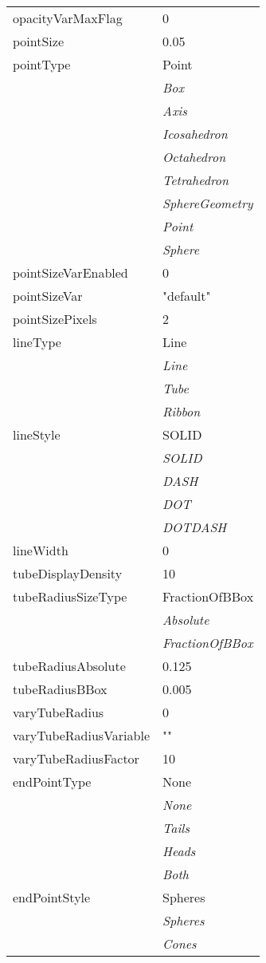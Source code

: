 \documentclass[10pt,a4paper]{report}
\begin{document}
\begin{longtable}{ll}
opacityVarMaxFlag  &  0 \\
pointSize  &  0.05 \\
pointType  &  Point   \\
 & {\it  Box} \\
 & {\it  Axis} \\
 & {\it  Icosahedron} \\
 & {\it  Octahedron} \\
 & {\it  Tetrahedron} \\
 & {\it  SphereGeometry} \\
 & {\it  Point} \\
 & {\it  Sphere} \\
pointSizeVarEnabled  &  0 \\
pointSizeVar  &  "default" \\
pointSizePixels  &  2 \\
lineType  &  Line   \\
 & {\it  Line} \\
 & {\it  Tube} \\
 & {\it  Ribbon} \\
lineStyle  &  SOLID   \\
 & {\it  SOLID} \\
 & {\it  DASH} \\
 & {\it  DOT} \\
 & {\it  DOTDASH} \\
lineWidth  &  0 \\
tubeDisplayDensity  &  10 \\
tubeRadiusSizeType  &  FractionOfBBox   \\
 & {\it  Absolute} \\
 & {\it  FractionOfBBox} \\
tubeRadiusAbsolute  &  0.125 \\
tubeRadiusBBox  &  0.005 \\
varyTubeRadius  &  0 \\
varyTubeRadiusVariable  &  "" \\
varyTubeRadiusFactor  &  10 \\
endPointType  &  None   \\
 & {\it  None} \\
 & {\it  Tails} \\
 & {\it  Heads} \\
 & {\it  Both} \\
endPointStyle  &  Spheres   \\
 & {\it  Spheres} \\
 & {\it  Cones} \\

\end{longtable}
\end{document}
